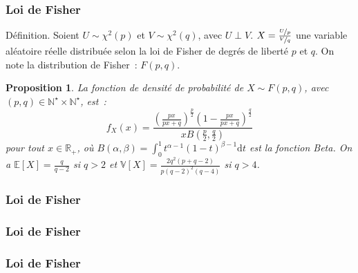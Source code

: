 \documentclass[10pt]{beamer}
\theoremstyle{plain}
\newenvironment{defn}[1]
{\bgroup \small\begin{block}{Définition. #1}}
  {\end{block}\egroup}
\newtheorem{prop}{Proposition}
\begin{document}
\begin{frame}
  \frametitle{Loi de Fisher}

  \begin{defn}{}
    Soient $U\sim\chi^2(p)$ et $V\sim\chi^2(q)$, avec  $U\perp V$. $X = \frac{\nicefrac{U}{p}}{\nicefrac{V}{q}}$ une variable aléatoire réelle distribuée selon la loi de Fisher de degrés de liberté $p$ et $q$. On note la distribution de Fisher~: $F(p,q)$.
  \end{defn}

  \bigskip

  \begin{prop}\label{prop:fisher}
    La fonction de densité de probabilité de $X\sim F(p,q)$,
    avec $(p,q)\in\mathbb N^{\star}\times \mathbb N^{\star}$, est~:
    \[
      f_X(x) = \frac{\left( \frac{px}{px+q} \right)^{\frac{p}{2}}\left( 1-\frac{px}{px+q} \right)^{\frac{q}{2}}}{x B\left(\frac{p}{2},\frac{q}{2}\right)}
    \]
    pour tout $x\in\mathbb R_+$, où $B(\alpha,\beta) = \int_0^1t^{\alpha-1}(1-t)^{\beta-1}\mathrm dt$ est la
    fonction Beta. On a $\mathbb E\left[ X \right]=\frac{q}{q-2}$ si $q>2$ et $\mathbb V\left[ X \right] = \frac{2q^2\left( p+q-2 \right)}{p\left( q-2 \right)^2\left( q-4 \right)}$ si $q>4$.
  \end{prop}

\end{frame}


\begin{frame}
  \frametitle{Loi de Fisher}

  \bigskip

  \begin{center}
    
  \end{center}


\end{frame}


\begin{frame}
  \frametitle{Loi de Fisher}

  \bigskip

  \begin{center}
    
  \end{center}


\end{frame}


\begin{frame}
  \frametitle{Loi de Fisher}

  \bigskip

  \begin{center}
    
  \end{center}


\end{frame}
\end{document}
